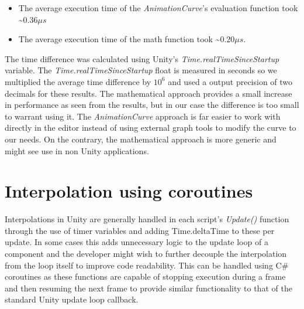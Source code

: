 \begin{itemize}
    \item The average execution time of the \emph{AnimationCurve}'s evaluation function took \textasciitilde$ 0.36 \mu s$
    \item The average execution time of the math function took \textasciitilde$ 0.20 \mu s$.
\end{itemize}

The time difference was calculated using Unity's \emph{Time.realTimeSinceStartup} variable. The \emph{Time.realTimeSinceStartup} float is measured in seconds so we multiplied the average time difference by $10^6$ and used a output precision of two decimals for these results. 
The mathematical approach provides a small increase in performance as seen from the results, but in our case the difference is too small to warrant using it. The \emph{AnimationCurve} approach is far easier to work with directly in the editor instead of using external graph tools to modify the curve to our needs. On the contrary, the mathematical approach is more generic and might see use in non Unity applications.

\section{Interpolation using coroutines}
Interpolations in Unity are generally handled in each script's \emph{Update()} function through the use of timer variables and adding Time.deltaTime to these per update. In some cases this adds unnecessary logic to the update loop of a component and the developer might wish to further decouple the interpolation from the loop itself to improve code readability. This can be handled using C\# coroutines as these functions are capable of stopping execution during a frame and then resuming the next frame to provide similar functionality to that of the standard Unity update loop callback. 

